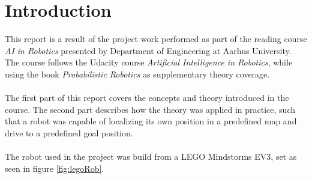 \chapter{Introduction}
\label{chp:intro}

This report is a result of the project work performed as part of the reading course \emph{AI in Robotics} presented by Department of Engineering at Aarhus University.
The course follows the Udacity course \emph{Artificial Intelligence in Robotics}, while using the book \emph{Probabilistic Robotics} \citep{AIbook} as supplementary theory coverage.\\\\
The first part of this report covers the concepts and theory introduced in the course.
The second part describes how the theory was applied in practice, such that a robot was capable of localizing its own position in a predefined map and drive to a predefined goal position.\\\\
The robot used in the project was build from a LEGO Mindstorms EV3, set as seen in figure \ref{fig:legoRob}.


